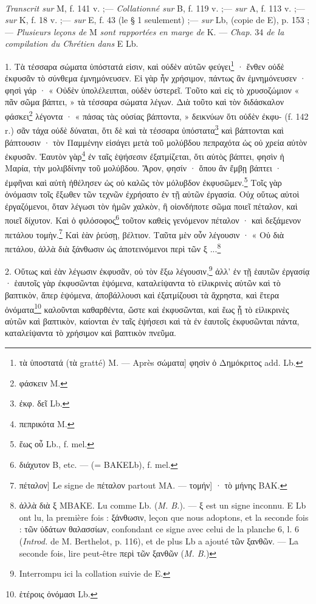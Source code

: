 \documentclass[landscape, a4paper, 11pt, oneside, polutonikogreek, french]{article}
\begin{document}
\paragraph{}
\emph{Transcrit sur} M, f. 141 v. ;--- \emph{Collationné sur} B, f. 119 v. ;--- \emph{sur} A, f. 113 v. ;--- \emph{sur} K, f. 18 v. ;--- \emph{sur} E, f. 43 (le § 1 seulement) ;--- \emph{sur} Lb, (copie de E), p. 153 ;--- \emph{Plusieurs leçons de} M \emph{sont rapportées en marge de} K. --- \emph{Chap.} 34 \emph{de la compilation du Chrétien dans} E Lb.

\bigskip

1. Τὰ τέσσαρα σώματα ὑπόστατά εἰσιν, καὶ οὐδὲν αὐτῶν φεύγει\footnote{τὰ ὑποστατά (τὰ gratté) M. --- Après σώματα] φησὶν ὁ Δημόκριτος add. Lb.} · ἔνθεν οὐδὲ ἐκφυσᾶν τὸ σύνθεμα ἐμνημόνευσεν. Εἰ γὰρ ἦν χρήσιμον, πάντως ἂν ἐμνημόνευσεν · φησὶ γάρ · « Οὐδὲν ὑπολέλειπται, οὐδὲν ὑστερεῖ. Τοῦτο καὶ εἰς τὸ χρυσοζώμιον « πᾶν σῶμα βάπτει, » τὰ τέσσαρα σώματα λέγων. Διὰ τοῦτο καὶ τὸν διδάσκαλον φάσκει\footnote{φάσκειν M.} λέγοντα · « πάσας τὰς οὐσίας βάπτοντα, » δεικνύων ὅτι οὐδὲν ἐκφυ- (f. 142 r.) σᾶν τάχα οὐδὲ δύναται, ὅτι δὲ καὶ τὰ τέσσαρα ὑπόστατα\footnote{ἐκφ. δεῖ Lb.} καὶ βάπτονται καὶ βάπτουσιν · τὸν Παμμένην εἰσάγει μετὰ τοῦ μολύβδου πεπραχότα ὡς οὐ χρεία αὐτὸν ἐκφυσᾶν. Ἑαυτὸν γὰρ\footnote{πεπρικότα M.} ἐν ταῖς ἑψήσεσιν ἐξατμίζεται, ὅτι αὐτὸς βάπτει, φησὶν ἡ Μαρία, τὴν μολιβδίνην τοῦ μολύβδου. Ἄρον, φησίν · ὅπου ἂν ἔμβῃ βάπτει · ἐμφῆναι καὶ αὐτὴ ἠθέλησεν ὡς οὐ καλῶς τὸν μόλυβδον ἐκφυσῶμεν.\footnote{ἕως οὖ Lb., f. mel.} Τοῖς γὰρ ὀνόμασιν τοῖς ἔξωθεν τῶν τεχνῶν ἐχρήσατο ἐν τῇ αὐτῶν ἐργασία. Οὐχ οὕτως αὐτοὶ ἐργαζόμενοι, ὅταν λέγωσι τὸν ἡμῶν χαλκὸν, ἢ οἱονδήποτε σῶμα ποιεῖ πέταλον, καὶ ποιεῖ δίχυτον. Καὶ ὁ φιλόσοφος\footnote{διάχυτον B, etc. --- (= BAKELb), f. mel.} τοῦτον καθεὶς γενόμενον πέταλον · καὶ δεξάμενον πετάλου τομὴν.\footnote{πέταλον] Le signe de πέταλον partout MA. --- τομήν] · τὸ μήνης BAK.} Καὶ ἑὰν ῥεύσῃ, βέλτιον. Ταῦτα μὲν οὖν λέγουσιν · « Οὐ διὰ πετάλου, ἀλλὰ διὰ ξάνθωσιν ὡς ἀποτεινόμενοι περὶ τῶν ξ ...\footnote{ἀλλὰ διὰ ξ MBAKE. Lu comme Lb. (\emph{M. B.}). --- ξ est un signe inconnu. E Lb ont lu, la première fois : ξάνθωσιν, leçon que nous adoptons, et la seconde fois : τῶν ὑδάτων θαλασσίων, confondant ce signe avec celui de la planche 6, l. 6 (\emph{Introd.} de M. Berthelot, p. 116), et de plus Lb a ajouté τῶν ξανθῶν. --- La seconde fois, lire peut-être περὶ τῶν ξανθῶν (\emph{M. B.})}

2. Οὕτως καὶ ἐὰν λέγωσιν ἐκφυσᾶν, οὐ τὸν ἔξω λέγουσιν,\footnote{Interrompu ici la collation suivie de E.} ἀλλ' ἐν τῇ ἑαυτῶν ἐργασίᾳ · ἑαυτοῖς γὰρ ἐκφυσῶνται ἑψόμενα, καταλείψαντα τὸ εἰλικρινὲς αὐτῶν καὶ τὸ βαπτικὸν, ἅπερ ἑψόμενα, ἀποβάλλουσι καὶ ἐξατμίζουσι τὰ ἄχρηστα, καὶ ἕτερα ὀνόματα\footnote{ἑτέροις ὀνόμασι Lb.} καλοῦνται καθαρθέντα, ὥστε καὶ ἐκφυσῶνται, καὶ ἕως ᾖ τὸ εἰλικρινὲς αὐτῶν καὶ βαπτικὸν, καίονται ἐν ταῖς ἑψήσεσι καὶ τὰ ἐν ἑαυτοῖς ἐκφυσῶνται πάντα, καταλείψαντα τὸ χρήσιμον καὶ βαπτικὸν πνεῦμα.
\end{document}
